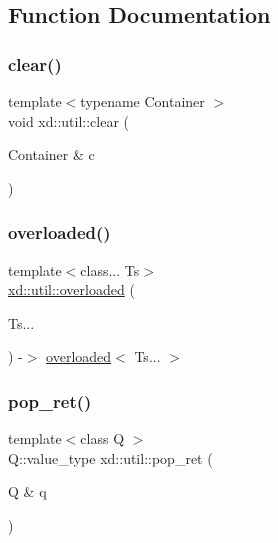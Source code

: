 \subsection{Function Documentation}
\mbox{\label{namespacexd_1_1util_a4f903686b50813e35a4b5b18d56a1692}} 
\subsubsection{\texorpdfstring{clear()}{clear()}}
{\footnotesize\ttfamily template$<$typename Container $>$ \\
void xd\+::util\+::clear (\begin{DoxyParamCaption}\item[{Container \&}]{c }\end{DoxyParamCaption})}

\mbox{\label{namespacexd_1_1util_a96cc83e3590a953a623c27d29bbf84b1}} 
\subsubsection{\texorpdfstring{overloaded()}{overloaded()}}
{\footnotesize\ttfamily template$<$class... Ts$>$ \\
\mbox{\hyperlink{structxd_1_1util_1_1overloaded}{xd\+::util\+::overloaded}} (\begin{DoxyParamCaption}\item[{Ts...}]{ }\end{DoxyParamCaption}) -\/$>$  \mbox{\hyperlink{structxd_1_1util_1_1overloaded}{overloaded}}$<$ Ts... $>$}

\mbox{\label{namespacexd_1_1util_aaf1057584ddba39b944a16b638449734}} 
\subsubsection{\texorpdfstring{pop\+\_\+ret()}{pop\_ret()}}
{\footnotesize\ttfamily template$<$class Q $>$ \\
Q\+::value\+\_\+type xd\+::util\+::pop\+\_\+ret (\begin{DoxyParamCaption}\item[{Q \&}]{q }\end{DoxyParamCaption})}

